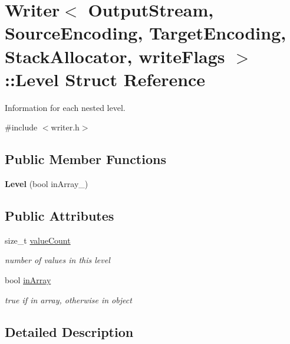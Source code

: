\hypertarget{a02428}{}\section{Writer$<$ Output\+Stream, Source\+Encoding, Target\+Encoding, Stack\+Allocator, write\+Flags $>$\+:\+:Level Struct Reference}
\label{a02428}


Information for each nested level.  




{\ttfamily \#include $<$writer.\+h$>$}

\subsection*{Public Member Functions}
\begin{DoxyCompactItemize}
\item 
\mbox{\label{a02428_a0b1844a7a1b7c6c20e1964dbb67da484}} 
{\bfseries Level} (bool in\+Array\+\_\+)
\end{DoxyCompactItemize}
\subsection*{Public Attributes}
\begin{DoxyCompactItemize}
\item 
\mbox{\label{a02428_a4a09e5fda49d0d57b2adc041203f244f}} 
size\+\_\+t \hyperlink{a02428_a4a09e5fda49d0d57b2adc041203f244f}{value\+Count}
\begin{DoxyCompactList}\small\item\em number of values in this level \end{DoxyCompactList}\item 
\mbox{\label{a02428_aa009a2d675e98757c2997072aad78789}} 
bool \hyperlink{a02428_aa009a2d675e98757c2997072aad78789}{in\+Array}
\begin{DoxyCompactList}\small\item\em true if in array, otherwise in object \end{DoxyCompactList}\end{DoxyCompactItemize}


\subsection{Detailed Description}
